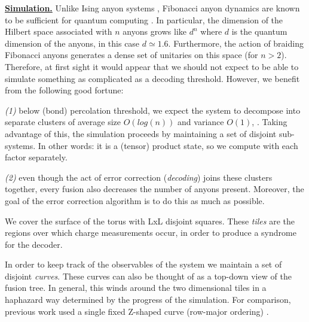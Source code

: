 \documentclass[12pt,notitlepage,aps,pra,longbibliography,nofootinbib,tightenlines,superscriptaddress]{revtex4}
\def\heading #1{\vskip 20pt \noindent\underline{\large \bf #1}\vskip 5pt}
\def\important #1{\underline{\bf #1}}
\begin{document}
\important{Simulation.}
Unlike Ising anyon systems \cite{Brell2013},
Fibonacci anyon dynamics are known to be sufficient
for quantum computing \cite{Freedman2002}.
In particular, the dimension of the Hilbert
space associated with $n$ anyons
grows like $d^n$ where $d$ is the quantum
dimension of the anyons, in this case $d\simeq 1.6.$
Furthermore, the action of braiding Fibonacci 
anyons generates a dense
set of unitaries on this space (for $n>2$).
Therefore, at first sight it would appear that
we should not expect to be able to simulate
something as complicated as a decoding threshold.
However, we benefit from the following 
good fortune:

{\it (1)} below (bond) percolation threshold, we
expect the system to decompose into 
separate clusters of average size
$O(log(n))$ and variance $O(1)$, \cite{Bazant2000}.
Taking advantage of this, the simulation
proceeds by maintaining a set of disjoint
sub-systems. In other words: it is a (tensor) product
state, so we compute with each factor
separately.

{\it (2)} 
even though the act of error correction ({\it decoding})
joins these clusters together, every fusion also
decreases the number of anyons present. Moreover,
the goal of the error correction algorithm is to do this as
much as possible.


We cover the surface of the torus with LxL disjoint squares.
These {\it tiles} are the regions over which
charge measurements occur, in order to
produce a syndrome for the decoder.

In order to keep track of the observables of the
system we maintain a set of disjoint {\it curves}.
These curves can also be thought of as a top-down
view of the fusion tree. In general, this winds around
the two dimensional tiles in a haphazard way determined by the
progress of the simulation.
For comparison,
previous work used a single fixed Z-shaped curve (row-major ordering)
\cite{Brell2013}.


\end{document}
